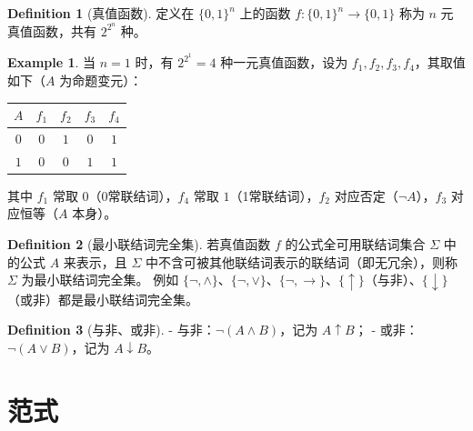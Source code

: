 \documentclass[oneside]{book}
\theoremstyle{definition}
\newtheorem{example}{Example}[section]
\newtheorem{definition}{Definition}[section]
\begin{document}
\begin{definition}[真值函数]
	定义在 \( \{0,1\}^n \) 上的函数 \( f: \{0,1\}^n \to \{0,1\} \) 称为 \( n \) 元真值函数，共有 \( 2^{2^n} \) 种。
\end{definition}

\begin{example}
	当 \( n = 1 \) 时，有 \( 2^{2^1} = 4 \) 种一元真值函数，设为 \( f_1, f_2, f_3, f_4 \)，其取值如下（\( A \) 为命题变元）：
	
	\begin{center}
		\begin{tabular}{|c|c|c|c|c|}
			\hline
			\( A \) & \( f_1 \) & \( f_2 \) & \( f_3 \) & \( f_4 \) \\
			\hline
			\( 0 \) & \( 0 \) & \( 1 \) & \( 0 \) & \( 1 \) \\
			\hline
			\( 1 \) & \( 0 \) & \( 0 \) & \( 1 \) & \( 1 \) \\
			\hline
		\end{tabular}
	\end{center}
	
	其中 \( f_1 \) 常取 \( 0 \)（0常联结词），\( f_4 \) 常取 \( 1 \)（1常联结词），\( f_2 \) 对应否定（\( \neg A \)），\( f_3 \) 对应恒等（\( A \) 本身）。
\end{example}
\begin{definition}[最小联结词完全集]
	若真值函数 \( f \) 的公式全可用联结词集合 \( \Sigma \) 中的公式 \( A \) 来表示，且 \( \Sigma \) 中不含可被其他联结词表示的联结词（即无冗余），则称 \( \Sigma \) 为最小联结词完全集。
	例如 \( \{\neg, \land\} \)、\( \{\neg, \lor\} \)、\( \{\neg, \to\} \)、\( \{\uparrow\} \)（与非）、\( \{\downarrow\} \)（或非）都是最小联结词完全集。
\end{definition}

\begin{definition}[与非、或非]
	- 与非：\( \neg (A \land B) \)，记为 \( A \uparrow B \)；
	- 或非：\( \neg (A \lor B) \)，记为 \( A \downarrow B \)。
\end{definition}

\section{范式}
\end{document}
